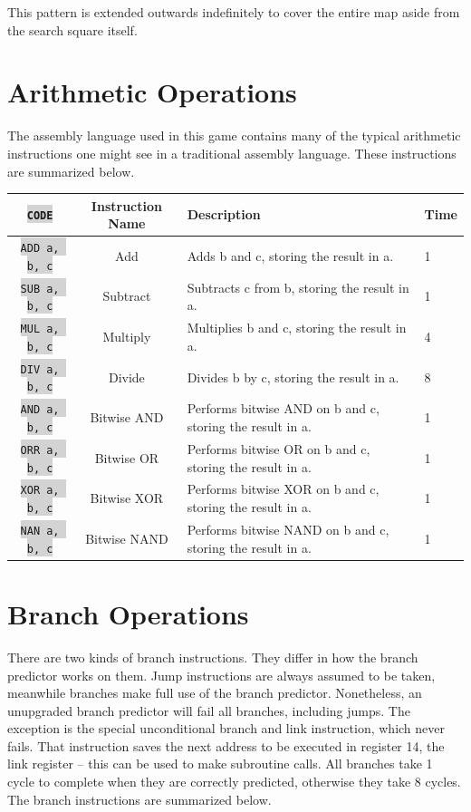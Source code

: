 \documentclass{article}
\newcommand{\vnscode}[1]{\colorbox{lightgray}{\lstinline[language=vns]{#1}}}
\begin{document}
This pattern is extended outwards indefinitely to cover the entire map aside
from the search square itself.

\section{Arithmetic Operations}

The assembly language used in this game contains many of the typical
arithmetic instructions one might see in a traditional assembly language. These
instructions are summarized below.

\begin{minipage}{\textwidth}
\centering
\begin{tabular}{|c|c|l|l|}
    \hline \vnscode{CODE} & Instruction Name & Description & Time \\ \hline
    \vnscode{ADD a, b, c} & Add & Adds b and c, storing the result in a. & 1 \\ \hline
    \vnscode{SUB a, b, c} & Subtract & Subtracts c from b, storing the result in a. & 1 \\ \hline
    \vnscode{MUL a, b, c} & Multiply & Multiplies b and c, storing the result in a. & 4 \\ \hline
    \vnscode{DIV a, b, c} & Divide & Divides b by c, storing the result in a. & 8 \\ \hline
    \vnscode{AND a, b, c} & Bitwise AND & Performs bitwise AND on b and c, storing the result in a. & 1 \\ \hline
    \vnscode{ORR a, b, c} & Bitwise OR & Performs bitwise OR on b and c, storing the result in a. & 1 \\ \hline
    \vnscode{XOR a, b, c} & Bitwise XOR & Performs bitwise XOR on b and c, storing the result in a. & 1 \\ \hline
    \vnscode{NAN a, b, c} & Bitwise NAND & Performs bitwise NAND on b and c, storing the result in a. & 1 \\ \hline
\end{tabular}
\end{minipage}

\section{Branch Operations}

There are two kinds of branch instructions. They differ in how the branch
predictor works on them. Jump instructions are always assumed to be taken,
meanwhile branches make full use of the branch predictor. Nonetheless, an
unupgraded branch predictor will fail all branches, including jumps. The
exception is the special unconditional branch and link instruction, which never
fails. That instruction saves the next address to be executed in register 14,
the link register -- this can be used to make subroutine calls. All branches
take 1 cycle to complete when they are correctly predicted, otherwise they take
8 cycles. The branch instructions are summarized below.
\end{document}
